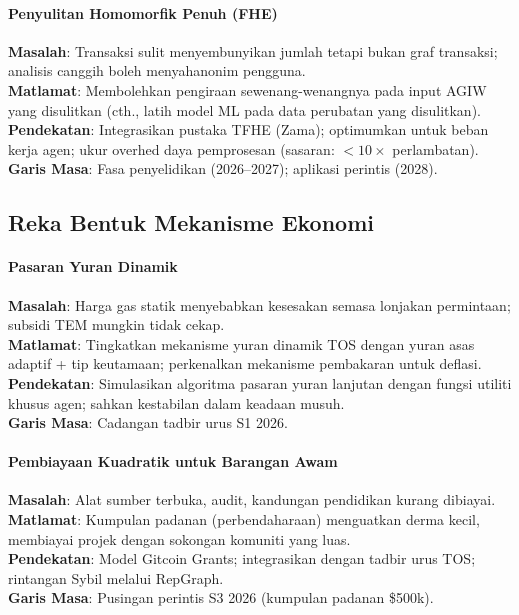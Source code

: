 \documentclass[11pt]{article}
\begin{document}
\paragraph{Penyulitan Homomorfik Penuh (FHE)}
\textbf{Masalah}: Transaksi sulit menyembunyikan jumlah tetapi bukan graf transaksi; analisis canggih boleh menyahanonim pengguna.\\
\textbf{Matlamat}: Membolehkan pengiraan sewenang-wenangnya pada input AGIW yang disulitkan (cth., latih model ML pada data perubatan yang disulitkan).\\
\textbf{Pendekatan}: Integrasikan pustaka TFHE (Zama); optimumkan untuk beban kerja agen; ukur overhed daya pemprosesan (sasaran: $<10\times$ perlambatan).\\
\textbf{Garis Masa}: Fasa penyelidikan (2026--2027); aplikasi perintis (2028).

\subsection{Reka Bentuk Mekanisme Ekonomi}

\paragraph{Pasaran Yuran Dinamik}
\textbf{Masalah}: Harga gas statik menyebabkan kesesakan semasa lonjakan permintaan; subsidi TEM mungkin tidak cekap.\\
\textbf{Matlamat}: Tingkatkan mekanisme yuran dinamik TOS dengan yuran asas adaptif + tip keutamaan; perkenalkan mekanisme pembakaran untuk deflasi.\\
\textbf{Pendekatan}: Simulasikan algoritma pasaran yuran lanjutan dengan fungsi utiliti khusus agen; sahkan kestabilan dalam keadaan musuh.\\
\textbf{Garis Masa}: Cadangan tadbir urus S1 2026.

\paragraph{Pembiayaan Kuadratik untuk Barangan Awam}
\textbf{Masalah}: Alat sumber terbuka, audit, kandungan pendidikan kurang dibiayai.\\
\textbf{Matlamat}: Kumpulan padanan (perbendaharaan) menguatkan derma kecil, membiayai projek dengan sokongan komuniti yang luas.\\
\textbf{Pendekatan}: Model Gitcoin Grants; integrasikan dengan tadbir urus TOS; rintangan Sybil melalui RepGraph.\\
\textbf{Garis Masa}: Pusingan perintis S3 2026 (kumpulan padanan \$500k).
\end{document}

